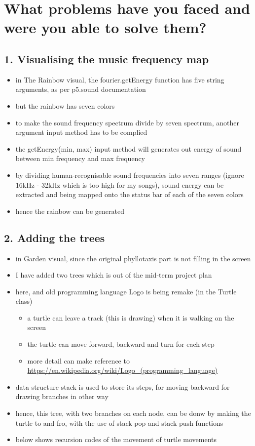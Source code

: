 \section*{What problems have you faced and were you able to solve them?}

\subsection*{1. Visualising the music frequency map}

\begin{itemize}
  \item in The Rainbow visual, the fourier.getEnergy function has five string arguments, as per p5.sound documentation
  \item but the rainbow has seven colors
  \item to make the sound frequency spectrum divide by seven spectrum, another argument input method has to be complied
  \item the getEnergy(min, max) input method will generates out energy of sound between min frequency and max frequency
  \item by dividing human-recognisable sound frequencies into seven ranges (ignore 16kHz - 32kHz which is too high for my songs), sound energy can be extracted and being mapped onto the status bar of each of the seven colors
  \item hence the rainbow can be generated
\end{itemize}

\subsection*{2. Adding the trees}

\begin{itemize}
  \item in Garden visual, since the original phyllotaxis part is not filling in the screen
  \item I have added two trees which is out of the mid-term project plan
  \item here, and old programming language Logo is being remake (in the Turtle class)
    \begin{itemize}
      \item a turtle can leave a track (this is drawing) when it is walking on the screen
      \item the turtle can move forward, backward and turn for each step
      \item more detail can make reference to \url{https://en.wikipedia.org/wiki/Logo_(programming_language)}
    \end{itemize}
  \item data structure stack is used to store its steps, for moving backward for drawing branches in other way
  \item hence, this tree, with two branches on each node, can be donw by making the turtle to and fro, with the use of stack pop and stack push functions
  \item below shows recursion codes of the movement of turtle movements
\end{itemize}

